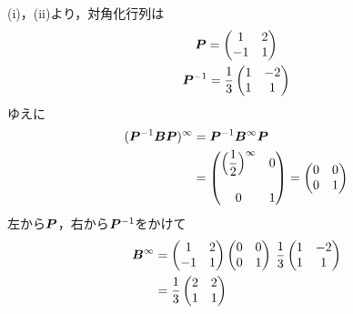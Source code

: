 \begin{ans*}
\begin{enumerate}[label=(\arabic*)]
    (i)，(ii)より，対角化行列\bP は
    \begin{gather}
      \bm{P} =
      \begin{pmatrix}
        1 & 2 \\-1 & 1
      \end{pmatrix} \\
      \bm{P}^{-1} = \frac{1}{3}
      \begin{pmatrix}
        1 & -2 \\1 & 1
      \end{pmatrix} \\
    \end{gather}
    ゆえに
    \begin{align}
      (\bm{P}^{-1}\bm{B}\bm{P})^{\infty} 
      &= \bm{P}^{-1}\bm{B}^{\infty}\bm{P}\\
      &= 
      \begin{pmatrix}
        \Bigl({\displaystyle \frac{1}{2}}\Bigr)^{\infty} & 0 \\ & \\ 0 & 1
      \end{pmatrix} =
      \begin{pmatrix}
        0 & 0 \\ 0 & 1
      \end{pmatrix}
    \end{align}
    左から$\bm{P}$，右から$\bm{P}^{-1}$をかけて
    \begin{align}
      \bm{B}^{\infty}
      &= 
      \begin{pmatrix}
        1 & 2 \\
        -1 & 1 \\
      \end{pmatrix}
      \begin{pmatrix}
        0 & 0 \\
        0 & 1 \\
      \end{pmatrix}
      \:\frac{1}{3}
      \begin{pmatrix}
        1 & -2 \\
        1 & 1 \\
      \end{pmatrix}\\
      &= \frac{1}{3}
      \begin{pmatrix}
        2 & 2 \\
        1 & 1 \\
      \end{pmatrix}
    \end{align}
  \end{enumerate}  
\end{ans*}

